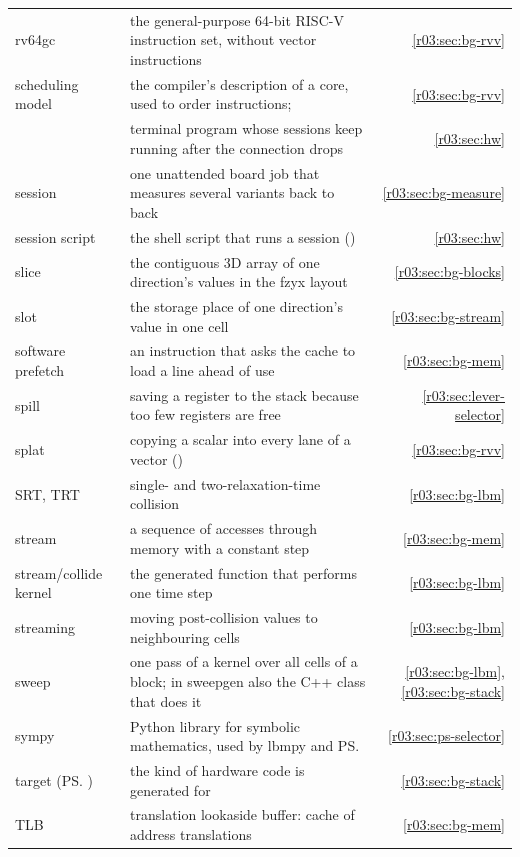 \begin{xltabular}{\linewidth}{@{}>{\raggedright\arraybackslash}p{3.6cm}>{\raggedright\arraybackslash}Xr@{}}
  rv64gc & the general-purpose 64-bit RISC-V instruction set, without vector instructions &
    \ref{r03:sec:bg-rvv}\\
  scheduling model & the compiler's description of a core, used to order instructions;
     & \ref{r03:sec:bg-rvv}\\
   & terminal program whose sessions keep running after the connection drops & \ref{r03:sec:hw}\\
  session & one unattended board job that measures several variants back to back &
    \ref{r03:sec:bg-measure}\\
  session script & the shell script that runs a session () & \ref{r03:sec:hw}\\
  slice & the contiguous 3D array of one direction's values in the fzyx layout &
    \ref{r03:sec:bg-blocks}\\
  slot & the storage place of one direction's value in one cell & \ref{r03:sec:bg-stream}\\
  software prefetch & an instruction that asks the cache to load a line ahead of use &
    \ref{r03:sec:bg-mem}\\
  spill & saving a register to the stack because too few registers are free & \ref{r03:sec:lever-selector}\\
  splat & copying a scalar into every lane of a vector () & \ref{r03:sec:bg-rvv}\\
  SRT, TRT & single- and two-relaxation-time collision & \ref{r03:sec:bg-lbm}\\
  stream & a sequence of accesses through memory with a constant step & \ref{r03:sec:bg-mem}\\
  stream/collide kernel & the generated function that performs one time step & \ref{r03:sec:bg-lbm}\\
  streaming & moving post-collision values to neighbouring cells & \ref{r03:sec:bg-lbm}\\
  sweep & one pass of a kernel over all cells of a block; in sweepgen also the C++ class that
    does it & \ref{r03:sec:bg-lbm}, \ref{r03:sec:bg-stack}\\
  sympy & Python library for symbolic mathematics, used by lbmpy and \ps{} & \ref{r03:sec:ps-selector}\\
  target (\ps{}) & the kind of hardware code is generated for & \ref{r03:sec:bg-stack}\\
  TLB & translation lookaside buffer: cache of address translations & \ref{r03:sec:bg-mem}\\

\end{xltabular}
